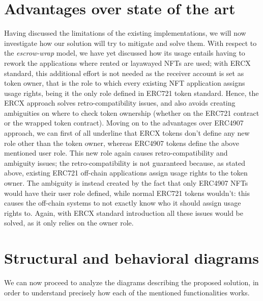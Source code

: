 \documentclass[english, LaM, oneside]{sapthesis}%
\begin{document}
\section{Advantages over state of the art}
Having discussed the limitations of the existing implementations, we will now investigate how our solution will try to mitigate and solve them. \newline
With respect to the \textit{escrow-wrap} model, we have yet discussed how its usage entails having to rework the applications where rented or layawayed NFTs are used; with ERCX standard, this additional effort is not needed as the receiver account is set as token owner, that is the role to which every existing NFT application assigns usage rights, being it the only role defined in ERC721 token standard. Hence, the ERCX approach solves retro-compatibility issues, and also avoids creating ambiguities on where to check token ownership (whether on the ERC721 contract or the wrapped token contract).\newline
Moving on to the advantages over ERC4907 approach, we can first of all underline that ERCX tokens don't define any new role other than the token owner, whereas ERC4907 tokens define the above mentioned user role. This new role again causes retro-compatibility and ambiguity issues; the retro-compatibility is not guaranteed because, as stated above, existing ERC721 off-chain applications assign usage rights to the token owner. The ambiguity is instead created by the fact that only ERC4907 NFTs would have their user role defined, while normal ERC721 tokens wouldn't: this causes the off-chain systems to not exactly know who it should assign usage rights to. Again, with ERCX standard introduction all these issues would be solved, as it only relies on the owner role.

\section{Structural and behavioral diagrams}
We can now proceed to analyze the diagrams describing the proposed solution, in order to understand precisely how each of the mentioned functionalities works.
\end{document}
